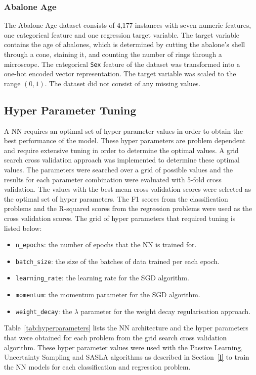 \documentclass[conference]{IEEEtran}
\begin{document}
	\subsubsection{Abalone Age}
	The Abalone Age dataset consists of 4,177 instances with seven numeric features, one categorical feature and one regression target variable. The target variable contains the age of abalones, which is determined by cutting the abalone's shell through a cone, staining it, and counting the number of rings through a microscope. The categorical \texttt{Sex} feature of the dataset was transformed into a one-hot encoded vector representation. The target variable was scaled to the range $(0, 1)$. The dataset did not consist of any missing values.
	
	\subsection{Hyper Parameter Tuning}
	A NN requires an optimal set of hyper parameter values in order to obtain the best performance of the model. These hyper parameters are problem dependent and require extensive tuning in order to determine the optimal values. A grid search cross validation approach was implemented to determine these optimal values. The parameters were searched over a grid of possible values and the results for each parameter combination were evaluated with 5-fold cross validation. The values with the best mean cross validation scores were selected as the optimal set of hyper parameters. The F1 scores from the classification problems and the R-squared scores from the regression problems were used as the cross validation scores. The grid of hyper parameters that required tuning is listed below:
	\begin{itemize}
		\item \texttt{n\_epochs}: the number of epochs that the NN is trained for.
		\item \texttt{batch\_size}: the size of the batches of data trained per each epoch.
		\item \texttt{learning\_rate}: the learning rate for the SGD algorithm.
		\item \texttt{momentum}: the momentum parameter for the SGD algorithm.
		\item \texttt{weight\_decay}: the $\lambda$ parameter for the weight decay regularisation approach.
	\end{itemize}
	Table~\ref{tab:hyperparameters} lists the NN architecture and the hyper parameters that were obtained for each problem from the grid search cross validation algorithm. These hyper parameter values were used with the Passive Learning, Uncertainty Sampling and SASLA algorithms as described in Section~\ref{I} to train the NN models for each classification and regression problem.
\end{document}
